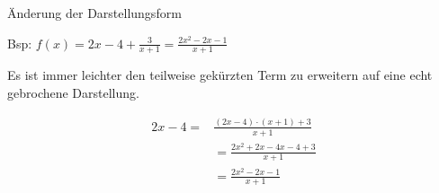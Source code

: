 \documentclass[paper=a6,landscape,ngerman,twoside=true,fontsize=12pt]{scrartcl}
\begin{document}
\begin{frage}
	Änderung der Darstellungsform \bigskip
	
	Bsp: $f(x)=2x -4 +\frac{3}{x+1}=\frac{2x^2-2x-1}{x+1}$
\end{frage}
\begin{antwort}
	\large Es ist immer leichter den teilweise gekürzten Term zu erweitern auf eine echt gebrochene Darstellung.
		
	\begin{align*}
		2x-4=&\frac{(2x-4)\cdot(x+1)+3}{x+1} \\
		&=\frac{2x^2+2x-4x-4+3}{x+1} \\			&=\frac{2x^2-2x-1}{x+1}\\
	\end{align*}
\end{antwort}
\end{document}
